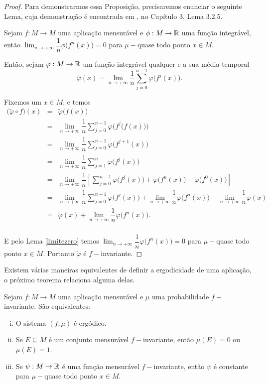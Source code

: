 \begin{proof} Para demonstrarmos essa Proposição, precisaremos enunciar o seguinte Lema, cuja demonstração é encontrada em \cite{viana}, no Capítulo 3, Lema 3.2.5.

\begin{lema}\label{limitezero} Sejam $f:M\to M$ uma aplicação mensurável e $\phi:M\to\mathbb{R}$ uma função integrável, então $\lim_{n\to+\infty}\dfrac{1}{n}\phi\big(f^n(x)\big)=0$ para $\mu-$quase todo ponto $x\in M$.
\end{lema}

Então, sejam $\varphi:M\to\mathbb{R}$ um função integrável qualquer e a sua média temporal
\begin{equation*}
\tilde{\varphi}(x) = \lim_{n\to+\infty}\dfrac{1}{n}\sum_{j=0}^{n-1}{\varphi\big(f^j(x)\big)}.
\end{equation*} 

Fixemos um $x\in M$, e temos
\begin{eqnarray*}
\big(\tilde{\varphi}\circ f\big)(x) & = & \tilde{\varphi}\big(f(x)\big)\\
& = & \lim_{n\to+\infty}\dfrac{1}{n}\sum_{j=0}^{n-1}{\varphi\Big(f^j\big(f(x)\big)\Big)}\\
& = & \lim_{n\to+\infty}\dfrac{1}{n}\sum_{j=0}^{n-1}{\varphi\big(f^{j+1}(x)\big)}\\
& = & \lim_{n\to+\infty}\dfrac{1}{n}\sum_{j=1}^{n}{\varphi\big(f^{j}(x)\big)}\\
& = & \lim_{n\to+\infty}\dfrac{1}{n}\left[\sum_{j=0}^{n-1}{\varphi\big(f^{j}(x)\big)}+\varphi\big(f^n(x)\big)-\varphi\big(f^0(x)\big)\right]\\
& = & \lim_{n\to+\infty}\dfrac{1}{n}\sum_{j=0}^{n-1}{\varphi\big(f^{j}(x)\big)}+\lim_{n\to+\infty}\dfrac{1}{n}\varphi\big(f^n(x)\big)-\lim_{n\to+\infty}\dfrac{1}{n}\varphi(x)\\
& = & \tilde{\varphi}(x)+\lim_{n\to+\infty}\dfrac{1}{n}\varphi\big(f^n(x)\big).\\
\end{eqnarray*}

E pelo Lema \ref{limitezero} temos $\lim_{n\to+\infty}\dfrac{1}{n}\varphi\big(f^n(x)\big)=0$ para $\mu-$quase todo ponto $x\in M$. Portanto $\tilde{\varphi}$ é $f-$invariante. 
\end{proof}

Existem várias maneiras equivalentes de definir a ergodicidade de uma aplicação, o próximo teorema relaciona alguma delas.

\begin{teorema}\label{eqiverg} Sejam $f:M\to M$ uma aplicação mensurável e $\mu$ uma probabilidade $f-$in\-va\-ri\-an\-te. São equivalentes:
\begin{enumerate}[i)]
\item O sistema $(f,\mu)$ é ergódico.
\item Se $E\subseteq M$ é um conjunto mensurável $f-$invariante, então $\mu(E)=0$ ou $\mu(E)=1$.
\item Se $\psi:M\to\mathbb{R}$ é uma função mensurável $f-$invariante, então $\psi$ é constante para $\mu-$qua\-se todo ponto $x\in M$.
\end{enumerate}
\end{teorema}

